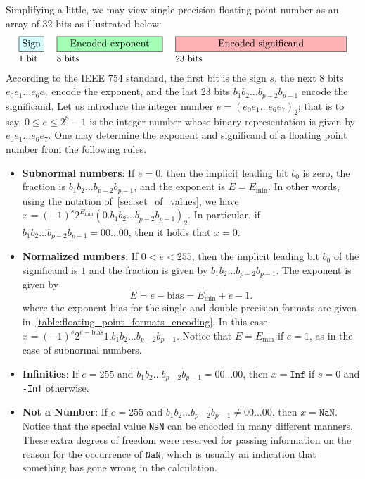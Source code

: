 Simplifying a little,
we may view single precision floating point number as an array of 32 bits as illustrated below:
\begin{alignat*}{3}
    &\fcolorbox{black}{lightcyan}{\text{Sign}}
    \hspace{.1cm}
    &&\fcolorbox{black}{lightgreen}{\quad\text{Encoded exponent}\quad}
    \hspace{.1cm}
    &&\fcolorbox{black}{lightred}{\qquad\qquad\text{Encoded significand}\qquad\qquad}\\[-.1cm]
    &\text{\small 1 bit} &&\text{\small 8 bits} &&\text{\small 23 bits}
\end{alignat*}
According to the IEEE 754 standard,
the first bit is the sign $s$,
the next 8 bits $e_0 e_1 \dots e_6 e_7$ encode the exponent,
and the last 23 bits $b_1 b_2 \dots b_{p-2} b_{p-1}$ encode the significand.
Let us introduce the integer number $e = (e_0 e_1 \dots e_6 e_7)_2$;
that is to say, $0 \leq e \leq 2^8 -1$ is the integer number whose binary representation
is given by $e_0 e_1 \dots e_6 e_7$.
One may determine the exponent and significand of a floating point number from the following rules.
\begin{itemize}
    \item
        \textbf{Subnormal numbers}:
        If $e = 0$, then the implicit leading bit $b_0$ is zero,
        the fraction is $b_1 b_2 \dots b_{p-2} b_{p-1}$, and the exponent is $E = E_{\min}$.
        In other words, using the notation of~\cref{sec:set_of_values},
        we have $x = (-1)^s 2^{E_{\min}} (0.b_1b_2 \dots b_{p-2} b_{p-1})_2$.
        In particular, if $b_1 b_2 \dots b_{p-2} b_{p-1} = 00\dots00$,
        then it holds that $x = 0$.
    \item
        \textbf{Normalized numbers}:
        If $0 < e < 255$,
        then the implicit leading bit $b_0$ of the significand is $1$
        and the fraction is given by $b_1 b_2 \dots b_{p-2} b_{p-1}$.
        The exponent is given by
        \[
            E = e - \mathrm{bias} = E_{\min} + e - 1.
        \]
        where the exponent bias for the single and double precision formats are given in~\cref{table:floating_point_formats_encoding}.
        In this case $x = (-1)^s 2^{e - \mathrm{bias}} 1.b_1b_2 \dots b_{p-2} b_{p-1}$.
        Notice that $E = E_{\min}$ if $e = 1$,
        as in the case of subnormal numbers.
    \item
        \textbf{Infinities}:
        If $e = 255$ and $b_1 b_2 \dots b_{p-2} b_{p-1} = 00\dots00$,
        then $x = \texttt{Inf}$ if $s = 0$ and \texttt{-Inf} otherwise.
    \item
        \textbf{Not a Number}:
        If $e = 255$ and  $b_1 b_2 \dots b_{p-2} b_{p-1} \neq 00\dots00$,
        then $x = \texttt{NaN}$.
        Notice that the special value \texttt{NaN} can be encoded in many different manners.
        These extra degrees of freedom were reserved for passing information on the reason for the occurrence of $\texttt{NaN}$,
        which is usually an indication that something has gone wrong in the calculation.
\end{itemize}

